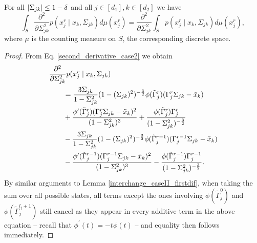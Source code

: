 \begin{corollary}
    For all $\lvert\Sigma_{jk}\rvert \leq 1-\delta$ and all $j \in [d_1], k\in [d_2]$ we have
    \begin{equation*}
        \int_S \frac{\partial^2 }{\partial \Sigma_{jk}^2} p(x_j^{r} \mid x_{k}, \Sigma_{jk}) d\mu(x^r_j)= \frac{\partial^2}{\partial \Sigma_{jk}^2} \int_S p(x_j^{r} \mid x_{k}, \Sigma_{jk}) d\mu(x^r_j),
    \end{equation*}
    where $\mu$ is the counting measure on $S$, the corresponding discrete space.

    \begin{proof}
        From Eq. \eqref{second_derivative_case2} we obtain
        \begin{align*}
            \MoveEqLeft \frac{\partial^2 }{\partial \Sigma_{jk}^2} p(x_j^{r} \mid x_{k}, \Sigma_{jk})                                                                                                                          \\
             & = \frac{3\Sigma_{jk}}{1-\Sigma_{jk}^2} (1-(\Sigma_{jk})^2)^{-\frac{3}{2}} \phi({\tilde{\Gamma}}_j^{r})({\Gamma}_j^r\Sigma_{jk} - {\tilde{x}}_{k})                                                               \\
             & +\frac{\phi^\prime({\tilde{\Gamma}}_j^{r})({\Gamma}_j^r\Sigma_{jk} - {\tilde{x}}_{k})^2}{(1-\Sigma_{jk}^2)^3} + \frac{\phi({\tilde{\Gamma}}_j^{r}){\Gamma}_j^{r}}{(1-\Sigma_{jk}^2)^{-\frac{3}{2}}}             \\
             & - \frac{3\Sigma_{jk}}{1-\Sigma_{jk}^2} (1-(\Sigma_{jk})^2)^{-\frac{3}{2}} \phi({\tilde{\Gamma}}_j^{r-1})({\Gamma}_j^{r-1}\Sigma_{jk} - {\tilde{x}}_{k})                                                         \\
             & - \frac{\phi^\prime({\tilde{\Gamma}}_j^{r-1})({\Gamma}_j^{r-1}\Sigma_{jk} - {\tilde{x}}_{k})^2}{(1-\Sigma_{jk}^2)^3} - \frac{\phi({\tilde{\Gamma}}_j^{r-1}){\Gamma}_j^{r-1}}{(1-\Sigma_{jk}^2)^{-\frac{3}{2}}}.
        \end{align*}
        By similar arguments to Lemma \ref{interchange_caseII_firstdif}, when taking the sum over all possible states, all terms except the ones involving $\phi({\tilde{\Gamma}}_j^{0})$ and $\phi({\tilde{\Gamma}}_j^{l_j +1})$ still cancel as they appear in every additive term in the above equation -- recall that $\phi^\prime(t) = -t\phi(t)$ -- and equality then follows immediately.
    \end{proof}
\end{corollary}



